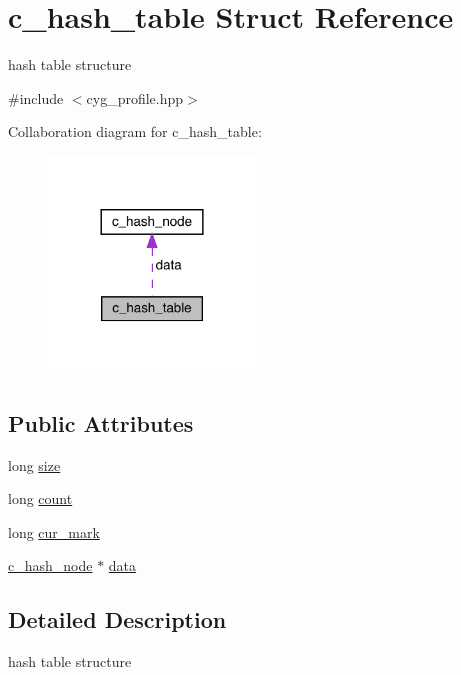 \hypertarget{structc__hash__table}{}\section{c\+\_\+hash\+\_\+table Struct Reference}
\label{structc__hash__table}


hash table structure  




{\ttfamily \#include $<$cyg\+\_\+profile.\+hpp$>$}



Collaboration diagram for c\+\_\+hash\+\_\+table\+:\nopagebreak
\begin{figure}[H]
\begin{center}
\leavevmode
\includegraphics[width=156pt]{structc__hash__table__coll__graph}
\end{center}
\end{figure}
\subsection*{Public Attributes}
\begin{DoxyCompactItemize}
\item 
long \hyperlink{structc__hash__table_afd5bfd9640fc5b72f75457fb7dd89663}{size}
\item 
long \hyperlink{structc__hash__table_ae4c33f323d44301e5990ba3355a2d708}{count}
\item 
long \hyperlink{structc__hash__table_a87debaad1679b5fd28537908174a7487}{cur\+\_\+mark}
\item 
\hyperlink{structc__hash__node}{c\+\_\+hash\+\_\+node} $\ast$ \hyperlink{structc__hash__table_abfdd282e54441552086f78d30b959d60}{data}
\end{DoxyCompactItemize}


\subsection{Detailed Description}
hash table structure 

